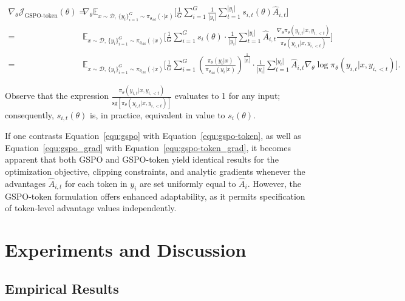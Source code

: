 \begin{align}
\nabla_{\theta} \mathcal{J}_\text{GSPO-token}(\theta)
=&\ 
\nabla_{\theta} \mathbb{E}_{ x \sim \mathcal{D},\, \{y_i\}_{i=1}^G \sim \pi_{\theta_\text{old}}( \cdot | x) }
\Bigg[ 
\frac{1}{G} \sum_{i=1}^{G}
\frac{1}{|y_i|} \sum_{t=1}^{|y_i|} 
s_{i,t}(\theta) \widehat{A}_{i,t}
\Bigg] \\
=&\ 
\mathbb{E}_{ x \sim \mathcal{D},\, \{y_i\}_{i=1}^G \sim \pi_{\theta_\text{old}}( \cdot | x) }
\Bigg[ 
\frac{1}{G} \sum_{i=1}^{G} s_i (\theta) \cdot \frac{1}{|y_i|} \sum_{t=1}^{|y_i|} 
\widehat{A}_{i,t} \frac{ \nabla_{\theta} \pi_{\theta} (y_{i,t} | x, y_{i,<t}) }{ \pi_{\theta} (y_{i,t} | x, y_{i,<t}) }
\Bigg] \\
=&\ 
\mathbb{E}_{ x \sim \mathcal{D},\, \{y_i\}_{i=1}^G \sim \pi_{\theta_\text{old}}( \cdot | x) }
\Bigg[ 
\frac{1}{G} \sum_{i=1}^{G}  \left( \frac{ \pi_{\theta} (y_i | x) }{ \pi_{\theta_\text{old}} (y_i | x)} \right)^{\frac{1}{|y_i|}}
\cdot \frac{1}{|y_i|} \sum_{t=1}^{|y_i|}
\widehat{A}_{i,t} \nabla_{\theta} \log \pi_{\theta} (y_{i,t} | x, y_{i,<t})  
\Bigg].
\label{equ:gspo-token_grad}
\end{align}

Observe that the expression $\frac{ \pi_{\theta} (y_{i,t} | x, y_{i,<t}) }{ \mathrm{sg} \left[ \pi_{\theta} (y_{i,t} | x, y_{i,<t}) \right] }$ evaluates to 1 for any input; consequently, $s_{i,t}(\theta)$ is, in practice, equivalent in value to $s_{i}(\theta)$.

If one contrasts Equation~\eqref{equ:gspo} with Equation~\eqref{equ:gspo-token}, as well as Equation~\eqref{equ:gspo_grad} with Equation~\eqref{equ:gspo-token_grad}, it becomes apparent that both GSPO and GSPO-token yield identical results for the optimization objective, clipping constraints, and analytic gradients whenever the advantages $\widehat{A}_{i,t}$ for each token in $y_i$ are set uniformly equal to $\widehat{A}_{i}$. However, the GSPO-token formulation offers enhanced adaptability, as it permits specification of token-level advantage values independently.

\section{Experiments and Discussion}

\subsection{Empirical Results}

